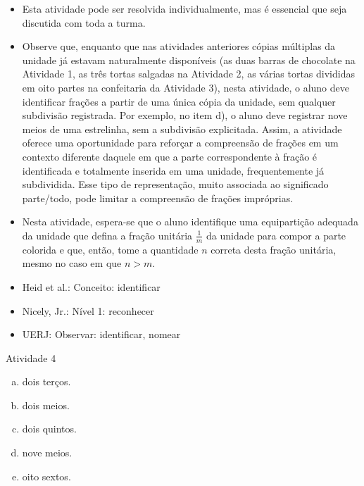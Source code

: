 \begin{multicols}{2}
  \begin{itemize} %
    \item       Esta atividade pode ser resolvida individualmente, mas é essencial que seja discutida com toda a turma.
    \item       Observe que, enquanto que nas atividades anteriores cópias múltiplas da unidade já estavam naturalmente disponíveis (as duas barras de chocolate na Atividade 1, as três tortas salgadas na Atividade 2, as várias tortas divididas em oito partes na confeitaria da Atividade 3), nesta atividade, o aluno deve identificar frações a partir de uma única cópia da unidade, sem qualquer subdivisão registrada. Por exemplo, no item d), o aluno deve registrar nove meios de uma estrelinha, sem a subdivisão explicitada. Assim, a atividade oferece uma oportunidade para reforçar a compreensão de frações em um contexto diferente daquele em que a parte correspondente à fração é identificada e totalmente inserida em uma unidade, frequentemente já subdividida. Esse tipo de representação, muito associada ao significado parte/todo, pode limitar a compreensão de frações impróprias.
    \item       Nesta atividade, espera-se que o aluno identifique uma equipartição adequada da unidade que defina a fração unitária       $\frac{1}{m}$ da unidade para compor a parte colorida e que, então, tome a quantidade       $n$ correta desta fração unitária, mesmo no caso em que       $n > m$.
\end{itemize} %


  \vspace{.1cm}

 \vspace{.1cm}
\begin{itemize} %
    \item       Heid et al.: Conceito: identificar
    \item       Nicely, Jr.: Nível 1: reconhecer
    \item       UERJ: Observar: identificar, nomear
\end{itemize} %

\newpage

\begin{resposta*}{Atividade 4}
  \begin{enumerate}[a)]
   \item dois terços.
   \item dois meios.
   \item dois quintos.
   \item nove meios.
   \item oito sextos.
\end{enumerate}
  \end{resposta*}


\end{multicols}

